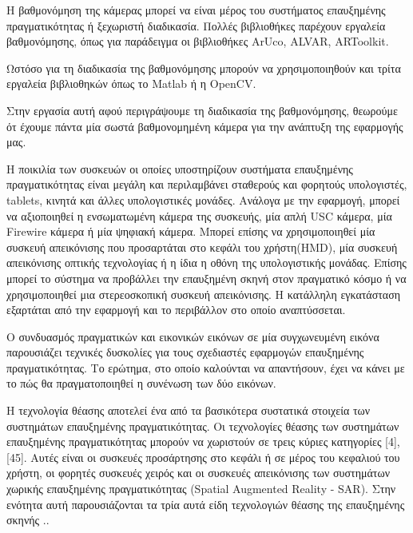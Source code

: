 Η βαθμονόμηση της κάμερας μπορεί να είναι μέρος του συστήματος επαυξημένης πραγματικότητας ή ξεχωριστή διαδικασία. Πολλές βιβλιοθήκες παρέχουν εργαλεία βαθμονόμησης, όπως για παράδειγμα οι βιβλιοθήκες ArUco, ALVAR, ARToolkit.


Ωστόσο για τη διαδικασία της βαθμονόμησης μπορούν να χρησιμοποιηθούν και τρίτα εργαλεία βιβλιοθηκών όπως το Matlab ή η OpenCV. 

Στην εργασία αυτή αφού περιγράψουμε τη διαδικασία της βαθμονόμησης, θεωρούμε ότ έχουμε πάντα μία σωστά βαθμονομημένη κάμερα για την ανάπτυξη της εφαρμογής μας.

Η ποικιλία των συσκευών οι οποίες υποστηρίζουν συστήματα επαυξημένης πραγματικότητας είναι μεγάλη και περιλαμβάνει σταθερούς και φορητούς υπολογιστές, tablets, κινητά και άλλες υπολογιστικές μονάδες. Ανάλογα με την εφαρμογή, μπορεί να αξιοποιηθεί η ενσωματωμένη κάμερα της συσκευής, μία απλή USC κάμερα, μία Firewire κάμερα ή μία ψηφιακή κάμερα. Μπορεί επίσης να χρησιμοποιηθεί μία συσκευή απεικόνισης που προσαρτάται στο κεφάλι του χρήστη(HMD), μία συσκευή απεικόνισης οπτικής τεχνολογίας ή η ίδια η οθόνη της υπολογιστικής μονάδας. Επίσης μπορεί το σύστημα να προβάλλει την επαυξημένη σκηνή στον πραγματικό κόσμο\cite{jones2013illumiroom} ή να χρησιμοποιηθεί μια στερεοσκοπική συσκευή απεικόνισης. Η κατάλληλη εγκατάσταση εξαρτάται από την εφαρμογή και το περιβάλλον στο οποίο αναπτύσσεται.








Ο συνδυασμός πραγματικών και εικονικών εικόνων σε μία συγχωνευμένη εικόνα παρουσιάζει τεχνικές δυσκολίες για τους σχεδιαστές εφαρμογών επαυξημένης πραγματικότητας.  Το ερώτημα, στο οποίο καλούνται να απαντήσουν, έχει να κάνει με το πώς θα πραγματοποιηθεί η συνένωση των δύο εικόνων.




Η τεχνολογία θέασης αποτελεί ένα από τα βασικότερα συστατικά στοιχεία των συστημάτων επαυξημένης πραγματικότητας. Οι τεχνολογίες θέασης των συστημάτων επαυξημένης πραγματικότητας μπορούν να χωριστούν σε τρεις κύριες κατηγορίες [4], [45]. Αυτές είναι οι συσκευές προσάρτησης στο κεφάλι ή σε μέρος του κεφαλιού του χρήστη, οι φορητές συσκευές χειρός και οι συσκευές απεικόνισης των συστημάτων χωρικής επαυξημένης πραγματικότητας (Spatial Augmented Reality - SAR). Στην ενότητα αυτή παρουσιάζονται τα τρία αυτά είδη τεχνολογιών θέασης της επαυξημένης σκηνής \cite{azuma1997} \cite{Vallino1998}  \cite{azuma2001} ..








